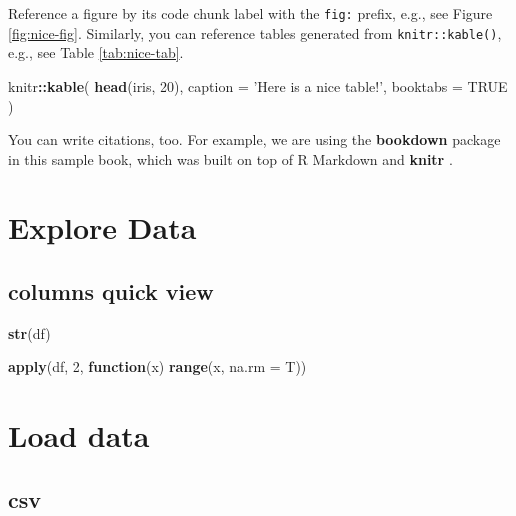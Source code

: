 \documentclass[
]{book}
\newenvironment{Shaded}{\begin{snugshade}}{\end{snugshade}}
\newcommand{\ControlFlowTok}[1]{\textcolor[rgb]{0.13,0.29,0.53}{\textbf{#1}}}
\newcommand{\DataTypeTok}[1]{\textcolor[rgb]{0.13,0.29,0.53}{#1}}
\newcommand{\DecValTok}[1]{\textcolor[rgb]{0.00,0.00,0.81}{#1}}
\newcommand{\KeywordTok}[1]{\textcolor[rgb]{0.13,0.29,0.53}{\textbf{#1}}}
\newcommand{\NormalTok}[1]{#1}
\newcommand{\OperatorTok}[1]{\textcolor[rgb]{0.81,0.36,0.00}{\textbf{#1}}}
\newcommand{\OtherTok}[1]{\textcolor[rgb]{0.56,0.35,0.01}{#1}}
\newcommand{\StringTok}[1]{\textcolor[rgb]{0.31,0.60,0.02}{#1}}
\begin{document}
Reference a figure by its code chunk label with the \texttt{fig:} prefix, e.g., see Figure \ref{fig:nice-fig}. Similarly, you can reference tables generated from \texttt{knitr::kable()}, e.g., see Table \ref{tab:nice-tab}.

\begin{Shaded}
\begin{Highlighting}[]
\NormalTok{knitr}\OperatorTok{::}\KeywordTok{kable}\NormalTok{(}
  \KeywordTok{head}\NormalTok{(iris, }\DecValTok{20}\NormalTok{), }\DataTypeTok{caption =} \StringTok{'Here is a nice table!'}\NormalTok{,}
  \DataTypeTok{booktabs =} \OtherTok{TRUE}
\NormalTok{)}
\end{Highlighting}
\end{Shaded}

You can write citations, too. For example, we are using the \textbf{bookdown} package \citep{R-bookdown} in this sample book, which was built on top of R Markdown and \textbf{knitr} \citep{xie2015}.

\hypertarget{explore-data}{%
\chapter{Explore Data}\label{explore-data}}

\hypertarget{columns-quick-view}{%
\section{columns quick view}\label{columns-quick-view}}

\begin{Shaded}
\begin{Highlighting}[]
\KeywordTok{str}\NormalTok{(df)}

\KeywordTok{apply}\NormalTok{(df, }\DecValTok{2}\NormalTok{, }\ControlFlowTok{function}\NormalTok{(x) }\KeywordTok{range}\NormalTok{(x, }\DataTypeTok{na.rm =}\NormalTok{ T))}
\end{Highlighting}
\end{Shaded}

\hypertarget{load-data}{%
\chapter{Load data}\label{load-data}}

\hypertarget{csv}{%
\section{csv}\label{csv}}
\end{document}
